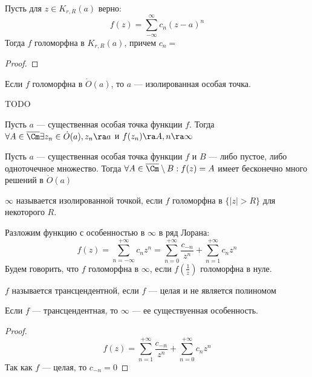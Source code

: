 \begin{theorem}
    Пусть для \(z \in K_{r, R}(a)\) верно:
    \[f(z) = \sum_{-\infty}^\infty c_n(z - a)^n\]
    Тогда \(f\) голоморфна в \(K_{r, R}(a)\), причем \(c_n = \)
\end{theorem}
\begin{proof}
    
\end{proof}

\begin{definition}
    Если \(f\) голоморфна в \(\dot O(a)\), то \(a\) --- изолированная особая точка.
\end{definition}


TODO


\begin{theorem}
    Пусть \(a\) --- существенная особая точка функции \(f\). Тогда \(\forall A \in \overline{\Cm} \exists z_n \in \dot O(a), z_n \ra a\) и \(f(z_n) \ra A, n \ra \infty\)
\end{theorem}

\begin{theorem}[Пикара]
    Пусть \(a\) --- существенная особая точка функции \(f\) и \(B\) --- либо пустое, либо одноточечное множество. Тогда \(\forall A \in \overline{\Cm} \setminus B: f(z) = A\) имеет бесконечно много решений в \(\dot O(a)\)
\end{theorem}

\begin{definition}
    \(\infty\) называется изолированной точкой, если \(f\) голоморфна в \(\{|z| > R\}\) для некоторого \(R\).
\end{definition}

Разложим функцию с особенностью в \(\infty\) в ряд Лорана:
\[f(z) = \sum_{n = -\infty}^{+\infty} c_nz^n = \sum_{n = 0}^{+\infty} \frac{c_{-n}}{z^n} + \sum_{n = 1}^{+\infty} c_nz^n\]
Будем говорить, что \(f\) голоморфна в \(\infty\), если \(f\left( \frac{1}{z} \right)\) голоморфна в нуле.

\begin{definition}
    \(f\) называется трансцендентной, если \(f\) --- целая и не является полиномом
\end{definition}

\begin{proposition}
    Если \(f\) --- трансцендентная, то \(\infty\) --- ее существуенная особенность.
\end{proposition}
\begin{proof}
    \[f(z) = \sum_{n = 1}^{+\infty} \frac{c_{-n}}{z^n} + \sum_{n = 0}^{+\infty} c_nz^n\]
    Так как \(f\) --- целая, то \(c_{-n} = 0\)
\end{proof}

